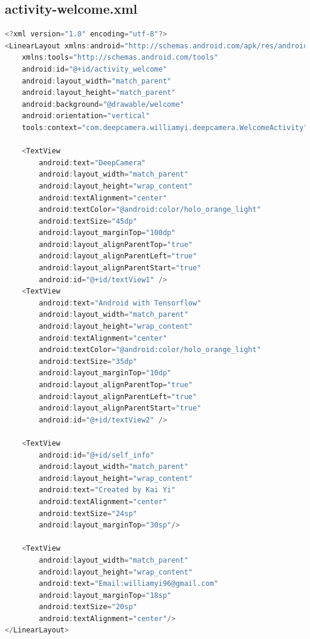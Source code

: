 \documentclass[UTF8, Microsoft YaHei]{book}
\begin{document}
    \subsection{activity-welcome.xml}
\begin{small}
\begin{lstlisting}[language=java]
<?xml version="1.0" encoding="utf-8"?>
<LinearLayout xmlns:android="http://schemas.android.com/apk/res/android"
    xmlns:tools="http://schemas.android.com/tools"
    android:id="@+id/activity_welcome"
    android:layout_width="match_parent"
    android:layout_height="match_parent"
    android:background="@drawable/welcome"
    android:orientation="vertical"
    tools:context="com.deepcamera.williamyi.deepcamera.WelcomeActivity">

    <TextView
        android:text="DeepCamera"
        android:layout_width="match_parent"
        android:layout_height="wrap_content"
        android:textAlignment="center"
        android:textColor="@android:color/holo_orange_light"
        android:textSize="45dp"
        android:layout_marginTop="100dp"
        android:layout_alignParentTop="true"
        android:layout_alignParentLeft="true"
        android:layout_alignParentStart="true"
        android:id="@+id/textView1" />
    <TextView
        android:text="Android with Tensorflow"
        android:layout_width="match_parent"
        android:layout_height="wrap_content"
        android:textAlignment="center"
        android:textColor="@android:color/holo_orange_light"
        android:textSize="35dp"
        android:layout_marginTop="10dp"
        android:layout_alignParentTop="true"
        android:layout_alignParentLeft="true"
        android:layout_alignParentStart="true"
        android:id="@+id/textView2" />

    <TextView
        android:id="@+id/self_info"
        android:layout_width="match_parent"
        android:layout_height="wrap_content"
        android:text="Created by Kai Yi"
        android:textAlignment="center"
        android:textSize="24sp"
        android:layout_marginTop="30sp"/>

    <TextView
        android:layout_width="match_parent"
        android:layout_height="wrap_content"
        android:text="Email:williamyi96@gmail.com"
        android:layout_marginTop="18sp"
        android:textSize="20sp"
        android:textAlignment="center"/>
</LinearLayout>
\end{lstlisting}
\end{small}
\end{document}
